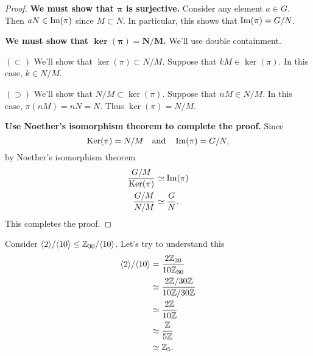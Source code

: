 \documentclass{ximera}
\begin{document}
\begin{theorem}
\begin{proof}
    \textbf{We must show that $\boldsymbol{\pi}$ is surjective.}
    Consider any element $a\in G$. Then $aN\in \operatorname{Im}(\pi)$ since
    $M\subset N$. In particular, this shows that $\operatorname{Im}(\pi) = G/N$.

    
    \textbf{We must show that $\boldsymbol{\ker(\pi)=N/M}$.} We'll use
    double containment.

    $(\subset)$ We'll show that $\ker(\pi)\subset N/M$.  Suppose that
    $kM\in\ker(\pi)$. In this case, $k\in N/M$.
    

    $(\supset)$ We'll show that $N/M\subset \ker(\pi)$. Suppose that
    $nM\in N/M$. In this case, $\pi(nM) = nN = N$. Thus
    $\ker(\pi)=N/M$.


    \textbf{Use Noether's isomorphism theorem to complete the proof.} Since
    \[
    \mathop{\mathrm{Ker}}\nolimits(\pi) = N/M\quad\text{and}\quad\operatorname{Im}(\pi) = G/N,
    \]
    by Noether's isomorphism theorem
    \begin{align*}
    \frac{G/M}{\mathop{\mathrm{Ker}}\nolimits(\pi)} &\simeq \operatorname{Im}(\pi)\\
    \frac{G/M}{N/M} &\simeq \frac{G}{N}.
    \end{align*}
    This completes the proof.
  \end{proof}
\end{theorem}

\begin{example}
  Consider $\langle2\rangle/\langle10\rangle\leq \mathbb Z_{30}/\langle10\rangle$. Let's try to
  understand this
  \begin{align*}
    \langle2\rangle/\langle10\rangle &= \frac{2\mathbb Z_{30}}{10\mathbb Z_{30}}\\
    &\simeq \frac{2\mathbb Z/30\mathbb Z}{10\mathbb Z/30\mathbb Z}\\
    &\simeq \frac{2\mathbb Z}{10\mathbb Z}\\
    &\simeq \frac{\mathbb Z}{5\mathbb Z}\\
    &\simeq \mathbb Z_5.
  \end{align*}
\end{example}
\end{document}
